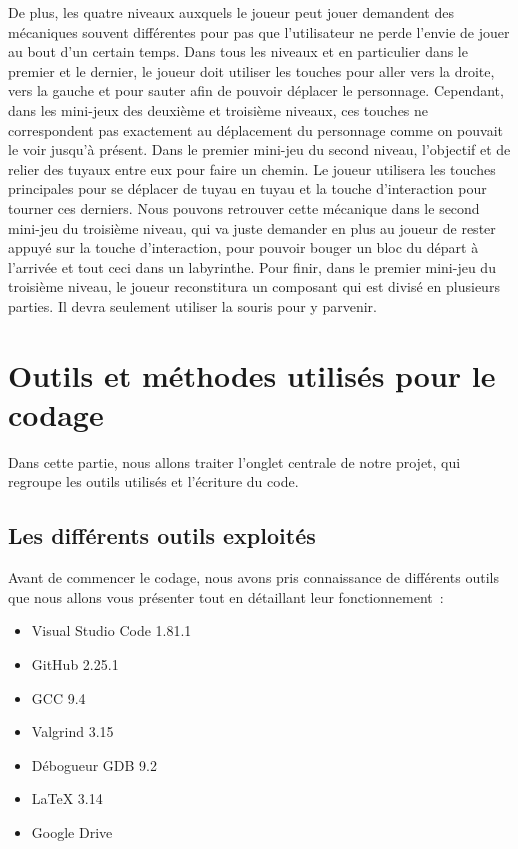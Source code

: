 \documentclass[12pt,a4paper]{article}
\begin{document}
            \tabto{1cm} De plus, les quatre niveaux auxquels le joueur peut jouer demandent des mécaniques souvent différentes pour pas que l’utilisateur ne perde l’envie de jouer au bout d’un certain temps. Dans tous les niveaux et en particulier dans le premier et le dernier, le joueur doit utiliser les touches pour aller vers la droite, vers la gauche et pour sauter afin de pouvoir déplacer le personnage. Cependant, dans les mini-jeux des deuxième et troisième niveaux, ces touches ne correspondent pas exactement au déplacement du personnage comme on pouvait le voir jusqu’à présent. Dans le premier mini-jeu du second niveau, l’objectif et de relier des tuyaux entre eux pour faire un chemin. Le joueur utilisera les touches principales pour se déplacer de tuyau en tuyau et la touche d’interaction pour tourner ces derniers. Nous pouvons retrouver cette mécanique dans le second mini-jeu du troisième niveau, qui va juste demander en plus au joueur de rester appuyé sur la touche d’interaction, pour pouvoir bouger un bloc du départ à l’arrivée et tout ceci dans un labyrinthe. Pour finir, dans le premier mini-jeu du troisième niveau, le joueur reconstitura un composant qui est divisé en plusieurs parties. Il devra seulement utiliser la souris pour y parvenir.\\
 
    \newpage

    \section{Outils et méthodes utilisés pour le codage}
        \tabto{1cm} Dans cette partie, nous allons traiter l'onglet centrale de notre projet, qui regroupe les outils utilisés et l'écriture du code.

        \subsection{Les différents outils exploités}
            \tabto{1cm} Avant de commencer le codage, nous avons pris connaissance de différents outils que nous allons vous présenter tout en détaillant leur fonctionnement~:\\
            
            \begin{itemize}
                \item Visual Studio Code 1.81.1
                \item GitHub 2.25.1
                \item GCC  9.4
                \item Valgrind 3.15
                \item Débogueur GDB 9.2
                \item LaTeX 3.14
                \item Google Drive
            \end{itemize}
\end{document}
